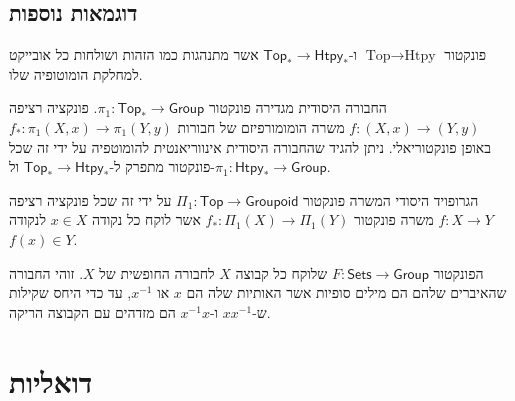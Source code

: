 \documentclass{tstextbook}
\begin{document}
\subsection{דוגמאות נוספות}

\begin{example}
פונקטור \(\text{Top}\to\text{Htpy}\) ו-\(\mathsf{Top}_{*}\to\mathsf{Htpy}_{*}\) אשר מתנהגות כמו הזהות ושולחות כל אובייקט למחלקת הומוטופיה שלו.

\end{example}
\begin{example}
החבורה היסודית מגדירה פונקטור \(\pi_{1}:\mathsf{Top}_{*}\to \mathsf{Group}\). פונקציה רציפה \(f:(X,x)\to (Y,y)\) משרה הומומורפיזם של חבורות \(f_{*}:\pi_{1}(X,x)\to\pi_{1}(Y,y)\) באופן פונקטוריאלי. ניתן להגיד שהחבורה היסודית אינווריאנטית להומוטפיה על ידי זה שכל פונקטור מתפרק ל-\(\mathsf{Top}_{*}\to \mathsf{Htpy}_{*}\) ול-\(\pi_{1}:\mathsf{Htpy}_{*}\to \mathsf{Group}\).

\end{example}
\begin{example}
הגרופויד היסודי המשרה פונקטור \(\Pi_{1}:\mathsf{Top}\to\mathsf{Groupoid}\) על ידי זה שכל פונקציה רציפה \(f:X\to Y\) משרה פונקטור \(f_{*}:\Pi_{1}(X)\to \Pi_{1}(Y)\) אשר לוקח כל נקודה \(x \in X\) לנקודה \(f(x)\in Y\). 

\end{example}
\begin{example}
הפונקטור \(F:\mathsf{Sets}\to\mathsf{Group}\) שלוקח כל קבוצה \(X\) לחבורה החופשית של \(X\). זוהי החבורה שהאיברים שלהם הם מילים סופיות אשר האותיות שלה הם \(x\) או \(x ^{-1}\), עד כדי היחס שקילות ש-\(x x ^{-1}\) ו-\(x ^{-1} x\) הם מזדהים עם הקבוצה הריקה.

\end{example}
\section{דואליות}
\end{document}
